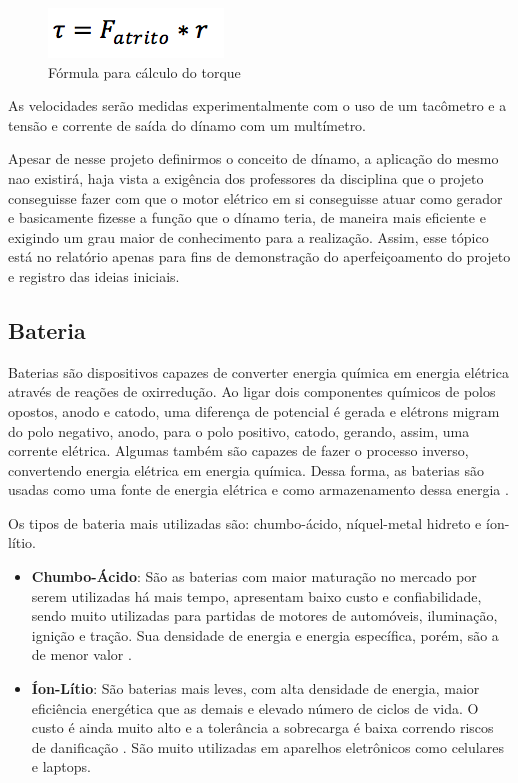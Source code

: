 \graphicspath{{figuras/}}
\begin{figure}[h!]
\centering
\includegraphics[scale=1.0]{torque}
\caption{Fórmula para cálculo do torque}
\label{img:torque}
\end{figure}


As velocidades serão medidas experimentalmente com o uso de um tacômetro e a tensão e corrente de saída do dínamo com um multímetro.

Apesar de nesse projeto definirmos o conceito de dínamo, a aplicação do mesmo nao existirá, haja vista a exigência dos professores da disciplina que o projeto conseguisse fazer com que o motor elétrico em si conseguisse atuar como gerador e basicamente fizesse a função que o dínamo teria, de maneira mais eficiente e exigindo um grau maior de conhecimento para a realização. Assim, esse tópico está no relatório apenas para fins de demonstração do aperfeiçoamento do projeto e registro das ideias iniciais. 
  
\subsection{Bateria}
	Baterias são dispositivos capazes de converter energia química em energia elétrica através de reações de oxirredução. Ao ligar dois componentes químicos de polos opostos, anodo e catodo, uma diferença de potencial é gerada e elétrons migram do polo negativo, anodo, para o polo positivo, catodo, gerando, assim, uma corrente elétrica. Algumas também são capazes de fazer o processo inverso, convertendo energia elétrica em energia química. Dessa forma, as baterias são usadas como uma fonte de energia elétrica e como armazenamento dessa energia \cite{varela}.
	
	Os tipos de bateria mais utilizadas são: chumbo-ácido, níquel-metal hidreto e íon-lítio.
	
	\begin{itemize}
		\item \textbf{Chumbo-Ácido}: São as baterias com maior maturação no mercado por serem utilizadas há mais tempo, apresentam baixo custo e confiabilidade, sendo muito utilizadas para partidas de motores de automóveis, iluminação, ignição e tração. Sua densidade de energia e energia específica, porém, são a de menor valor \cite{bezerra}.
	\item \textbf{Íon-Lítio}:  São baterias mais leves, com alta densidade de energia, maior eficiência energética que as demais e elevado número de ciclos de vida. O custo é ainda muito alto e a tolerância a sobrecarga é baixa correndo riscos de danificação \cite{bezerra}. São muito utilizadas em aparelhos eletrônicos como celulares e laptops.
	\end{itemize}
	
